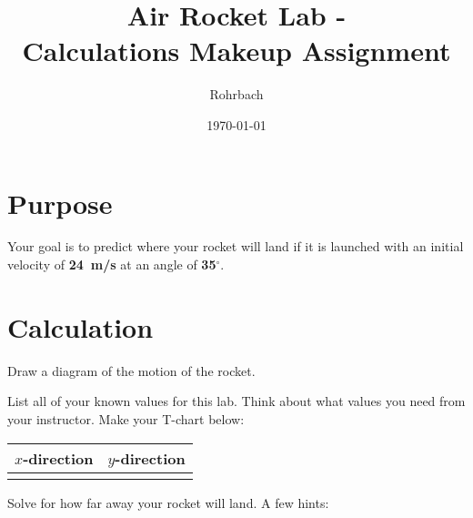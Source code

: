 \documentclass[10pt]{exam}
\title{Air Rocket Lab - \\ \sc Calculations Makeup Assignment}
\author{Rohrbach}
\date{\today}
\begin{document}
\maketitle

\section*{Purpose}

  Your goal is to predict where your rocket will land if it is launched with an initial velocity of \textbf{24~m/s} at an angle of \textbf{35$^\circ$}.


\section*{Calculation}

\begin{questions}

  \question \label{diagram}
    Draw a diagram of the motion of the rocket.
    \vs

  \question \label{t-chart}
    List all of your known values for this lab.  Think about what values you need from your instructor.  Make your T-chart below:

    \begin{center}
      \begin{tabular}{l|c}
        $x$-direction & $y$-direction \\\hline
        & \\[6em]
      \end{tabular}
    \end{center}

  \question \label{calc}
    Solve for how far away your rocket will land.  A few hints:


    \vs[3]

\end{questions}
\end{document}
